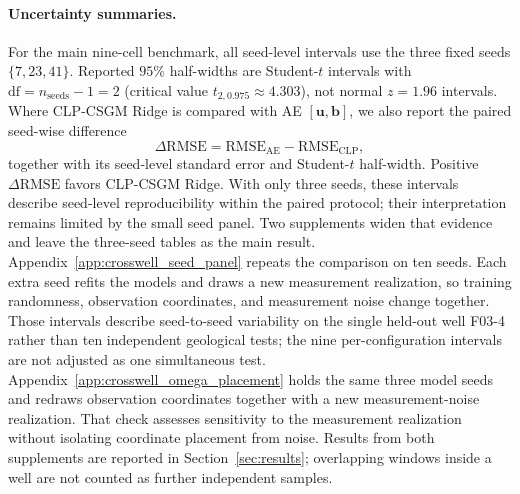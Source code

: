 \paragraph{Uncertainty summaries.}
For the main nine-cell benchmark, all seed-level intervals use the three fixed
seeds $\{7,23,41\}$. Reported
$95\%$ half-widths are Student-$t$ intervals with
$\mathrm{df}=n_{\mathrm{seeds}}-1=2$ (critical value
$t_{2,0.975}\approx 4.303$), not normal $z=1.96$ intervals. Where CLP-CSGM
Ridge is compared with AE $[\boldsymbol{u},\boldsymbol{b}]$, we also report the
paired seed-wise difference
\[
\Delta\mathrm{RMSE}
=
\mathrm{RMSE}_{\mathrm{AE}}
-
\mathrm{RMSE}_{\mathrm{CLP}},
\]
together with its seed-level standard error and Student-$t$ half-width.
Positive $\Delta\mathrm{RMSE}$ favors CLP-CSGM Ridge. With only three seeds,
these intervals describe seed-level reproducibility within the paired protocol;
their interpretation remains limited by the small seed panel.
Two supplements widen that evidence and leave the three-seed tables as the
main result.
Appendix~\ref{app:crosswell_seed_panel} repeats the comparison on ten seeds.
Each extra seed refits the models and draws a new measurement realization, so
training randomness, observation coordinates, and measurement noise change
together. Those intervals describe seed-to-seed variability on the single
held-out well F03-4 rather than ten independent geological tests; the nine
per-configuration intervals are not adjusted as one simultaneous test.
Appendix~\ref{app:crosswell_omega_placement} holds the same three model seeds
and redraws observation coordinates together with a new measurement-noise
realization. That check assesses sensitivity to the measurement realization
without isolating coordinate placement from noise. Results from both
supplements are reported in Section~\ref{sec:results}; overlapping windows
inside a well are not counted as further independent samples.